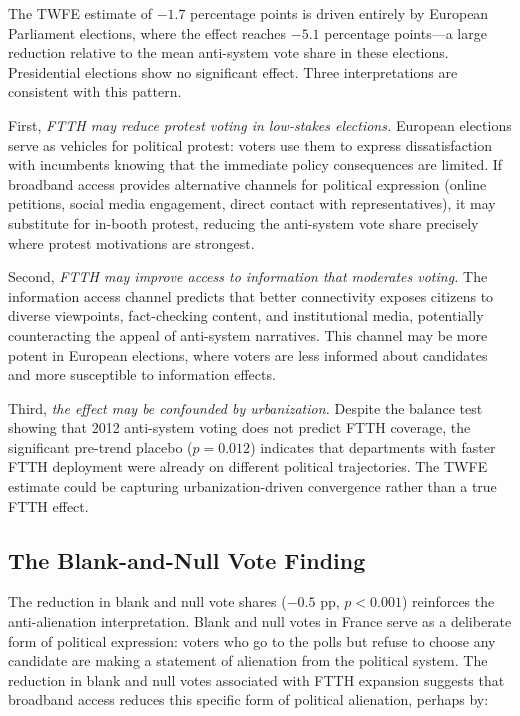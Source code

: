 \documentclass[12pt]{article}
\begin{document}
The TWFE estimate of $-1.7$ percentage points is driven entirely by European Parliament elections, where the effect reaches $-5.1$ percentage points---a large reduction relative to the mean anti-system vote share in these elections. Presidential elections show no significant effect. Three interpretations are consistent with this pattern.

First, \emph{FTTH may reduce protest voting in low-stakes elections.} European elections serve as vehicles for political protest: voters use them to express dissatisfaction with incumbents knowing that the immediate policy consequences are limited. If broadband access provides alternative channels for political expression (online petitions, social media engagement, direct contact with representatives), it may substitute for in-booth protest, reducing the anti-system vote share precisely where protest motivations are strongest.

Second, \emph{FTTH may improve access to information that moderates voting.} The information access channel \citep{gentzkow2011ideological} predicts that better connectivity exposes citizens to diverse viewpoints, fact-checking content, and institutional media, potentially counteracting the appeal of anti-system narratives. This channel may be more potent in European elections, where voters are less informed about candidates and more susceptible to information effects.

Third, \emph{the effect may be confounded by urbanization.} Despite the balance test showing that 2012 anti-system voting does not predict FTTH coverage, the significant pre-trend placebo ($p = 0.012$) indicates that departments with faster FTTH deployment were already on different political trajectories. The TWFE estimate could be capturing urbanization-driven convergence rather than a true FTTH effect.

\subsection{The Blank-and-Null Vote Finding}

The reduction in blank and null vote shares ($-0.5$ pp, $p < 0.001$) reinforces the anti-alienation interpretation. Blank and null votes in France serve as a deliberate form of political expression: voters who go to the polls but refuse to choose any candidate are making a statement of alienation from the political system. The reduction in blank and null votes associated with FTTH expansion suggests that broadband access reduces this specific form of political alienation, perhaps by:
\end{document}
